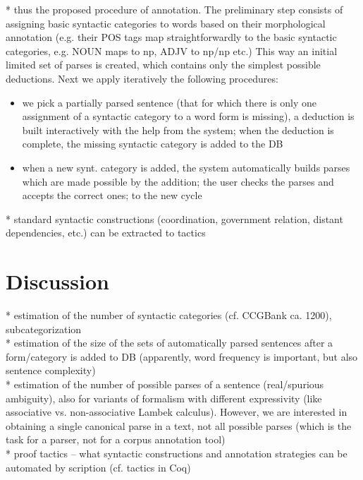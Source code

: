 \documentclass[a4paper]{article}
\theoremstyle{example-style}
\begin{document}
  * thus the proposed procedure of annotation. The preliminary step consists of assigning basic syntactic categories to words based on their morphological annotation (e.g. their POS tags map straightforwardly to the basic syntactic categories, e.g. NOUN maps to np, ADJV to np/np etc.) This way an initial limited set of parses is created, which contains only the simplest possible deductions. Next we apply iteratively the following procedures:
  \begin{itemize}
  	\item we pick a partially parsed sentence (that for which there is only one assignment of a syntactic category to a word form is missing), a deduction is built interactively with the help from the system; when the deduction is complete, the missing syntactic category is added to the DB
  	\item when a new synt. category is added, the system automatically builds parses which are made possible by the addition; the user checks the parses and accepts the correct ones; to the new cycle
  \end{itemize} 
  
  * standard syntactic constructions (coordination, government relation, distant dependencies, etc.) can be extracted to tactics 
    

\section{Discussion}

  * estimation of the number of syntactic categories (cf. CCGBank ca. 1200), subcategorization \\
  
  * estimation of the size of the sets of automatically parsed sentences after a form/category is added to DB (apparently, word frequency is important, but also sentence complexity) \\
  
  * estimation of the number of possible parses of a sentence (real/spurious ambiguity), also for variants of formalism with different expressivity (like associative vs. non-associative Lambek calculus). However, we are interested in obtaining a single canonical parse in a text, not all possible parses (which is the task for a parser, not for a corpus annotation tool) \\
  
  * proof tactics -- what syntactic constructions and annotation strategies can be automated by scription (cf. tactics in Coq) \\
  
\end{document}
